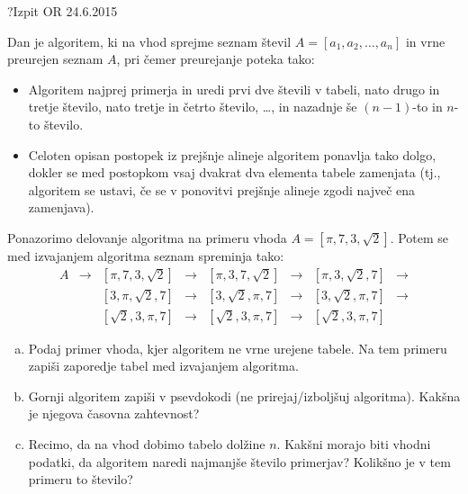 \begin{naloga}{?}{Izpit OR 24.6.2015}
\begin{vprasanje}[preurejanje]
Dan je algoritem, ki na vhod sprejme seznam števil
$A = [a_1, a_2, \dots, a_n]$
in vrne preurejen seznam $A$,
pri čemer preurejanje poteka tako:
\begin{itemize}
\item Algoritem najprej primerja in uredi prvi dve števili v tabeli,
nato drugo in tretje število, nato tretje in četrto število, \dots,
in nazadnje še $(n-1)$-to in $n$-to število.
\item Celoten opisan postopek iz prejšnje alineje
algoritem ponavlja tako dolgo,
dokler se med postopkom vsaj dvakrat dva elementa tabele zamenjata
(tj., algoritem se ustavi,
če se v ponovitvi prejšnje alineje zgodi največ ena zamenjava).
\end{itemize}

Ponazorimo delovanje algoritma na primeru vhoda $A = [\pi, 7, 3, \sqrt{2}]$.
Potem se med izvajanjem algoritma seznam spreminja tako:
$$
\begin{array}{cccccccc}
A &\to& [\pi, 7, 3, \sqrt{2}]
  &\to& [\pi, 3, 7, \sqrt{2}]
  &\to& [\pi, 3, \sqrt{2}, 7] &\to \\
  &   & [3, \pi, \sqrt{2}, 7]
  &\to& [3, \sqrt{2}, \pi, 7]
  &\to& [3, \sqrt{2}, \pi, 7] &\to \\
  &   & [\sqrt{2}, 3, \pi, 7]
  &\to& [\sqrt{2}, 3, \pi, 7]
  &\to& [\sqrt{2}, 3, \pi, 7]
\end{array}
$$

\begin{enumerate}[(a)]
\item Podaj primer vhoda, kjer algoritem ne vrne urejene tabele.
Na tem primeru zapiši zaporedje tabel med izvajanjem algoritma.

\item Gornji algoritem zapiši v psevdokodi (ne prirejaj/izboljšuj algoritma).
Kakšna je njegova časovna zahtevnost?

\item Recimo, da na vhod dobimo tabelo dolžine $n$.
Kakšni morajo biti vhodni podatki,
da algoritem naredi najmanjše število primerjav?
Kolikšno je v tem primeru to število?
\end{enumerate}
\end{vprasanje}
\begin{odgovor}
\end{odgovor}
\end{naloga}
